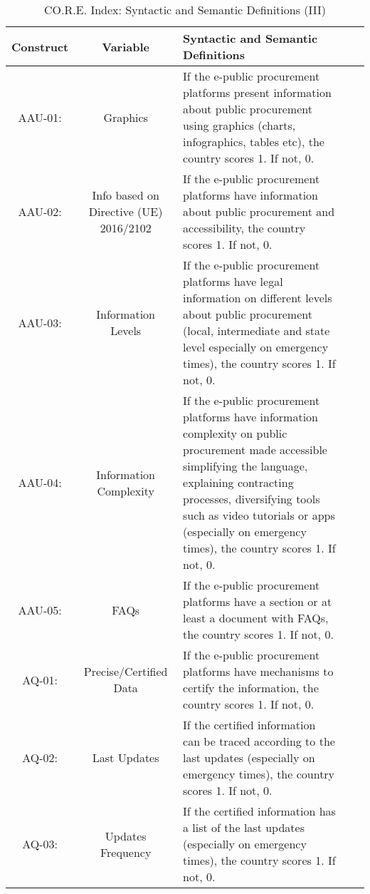 \documentclass[a4paper, twoside]{report}
\begin{document}
\begin{table}[htbp]
  \centering
  \caption{CO.R.E. Index: Syntactic and Semantic Definitions (III)}
   \tabcolsep=0.80cm
	\renewcommand{\arraystretch}{2.3}
	\begin{adjustbox}{max width=\linewidth}
       \begin{tabular}{ccp{30em}p{35em}p{31.335em}}
    \toprule
    Construct & Variable & Syntactic and Semantic Definitions \\
    \toprule
    AAU-01: & Graphics & If the e-public procurement platforms present information about public procurement using graphics (charts, infographics, tables etc), the country scores 1. If not, 0. \\
    AAU-02: & Info based on Directive (UE) 2016/2102 & If the e-public procurement platforms have information about public procurement and accessibility, the country scores 1. If not, 0.   \\
    AAU-03: & \cellcolor[rgb]{ .749,  .749,  .749}Information Levels & \cellcolor[rgb]{ .749,  .749,  .749}If the e-public procurement platforms have legal information on different levels about public procurement (local, intermediate and state level especially on emergency times), the country scores 1. If not, 0.  \\
    AAU-04: & \cellcolor[rgb]{ .749,  .749,  .749}Information Complexity & \cellcolor[rgb]{ .749,  .749,  .749}If the e-public procurement platforms have information complexity on public procurement made accessible simplifying the language, explaining contracting processes, diversifying tools such as video tutorials or apps (especially on emergency times), the country scores 1. If not, 0. \\
    AAU-05: & \cellcolor[rgb]{ .749,  .749,  .749}FAQs & \cellcolor[rgb]{ .749,  .749,  .749}If the e-public procurement platforms have a section or at least a document with FAQs, the country scores 1. If not, 0. \\
    \midrule
    AQ-01: & Precise/Certified Data & If the e-public procurement platforms have mechanisms to certify the information, the country scores 1. If not, 0. \\
    AQ-02: & \cellcolor[rgb]{ .749,  .749,  .749}Last Updates & \cellcolor[rgb]{ .749,  .749,  .749}If the certified information can be traced according to the last updates (especially on emergency times), the country scores 1. If not, 0.  \\
    AQ-03: & \cellcolor[rgb]{ .749,  .749,  .749}Updates Frequency & \cellcolor[rgb]{ .749,  .749,  .749}If the certified information has a list of the last updates (especially on emergency times), the country scores 1. If not, 0. \\

\end{tabular}
\end{adjustbox}
\end{table}
\end{document}
